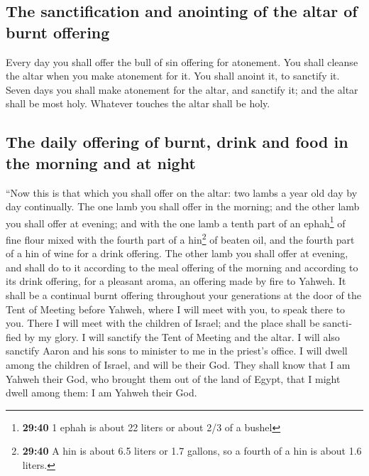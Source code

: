 \begin{paracol}{2}
\begin{otherlanguage}{english}
\hypertarget{the-sanctification-and-anointing-of-the-altar-of-burnt-offering}{%
\subsection{The sanctification and anointing of the altar of burnt
offering}\label{the-sanctification-and-anointing-of-the-altar-of-burnt-offering}}

 Every day you shall offer the bull of sin offering for
atonement. You shall cleanse the altar when you make atonement for it.
You shall anoint it, to sanctify it.  Seven days you
shall make atonement for the altar, and sanctify it; and the altar shall
be most holy. Whatever touches the altar shall be holy.

\hypertarget{the-daily-offering-of-burnt-drink-and-food-in-the-morning-and-at-night}{%
\subsection{The daily offering of burnt, drink and food in the morning
and at
night}\label{the-daily-offering-of-burnt-drink-and-food-in-the-morning-and-at-night}}

 ``Now this is that which you shall offer on the altar:
two lambs a year old day by day continually.  The one
lamb you shall offer in the morning; and the other lamb you shall offer
at evening;  and with the one lamb a tenth part of an
ephah\footnote{\textbf{29:40} 1 ephah is about 22 liters or about 2/3 of
  a bushel} of fine flour mixed with the fourth part of a hin\footnote{\textbf{29:40}
  A hin is about 6.5 liters or 1.7 gallons, so a fourth of a hin is
  about 1.6 liters.} of beaten oil, and the fourth part of a hin of wine
for a drink offering.  The other lamb you shall offer at
evening, and shall do to it according to the meal offering of the
morning and according to its drink offering, for a pleasant aroma, an
offering made by fire to Yahweh.  It shall be a continual
burnt offering throughout your generations at the door of the Tent of
Meeting before Yahweh, where I will meet with you, to speak there to
you.  There I will meet with the children of Israel; and
the place shall be sanctified by my glory.  I will
sanctify the Tent of Meeting and the altar. I will also sanctify Aaron
and his sons to minister to me in the priest's office.  I
will dwell among the children of Israel, and will be their God.
 They shall know that I am Yahweh their God, who brought
them out of the land of Egypt, that I might dwell among them: I am
Yahweh their God.


\end{otherlanguage}
\end{paracol}
